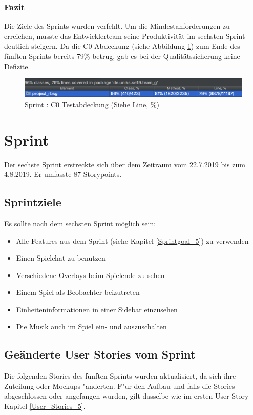 \documentclass[12pt, titlepage]{scrartcl}
\newcommand{\RN}[1]{%
	\textup{\uppercase\expandafter{\romannumeral#1}}%
}
\begin{document}
        	\subsubsection{Fazit}
        		Die Ziele des Sprints wurden verfehlt. Um die Mindestanforderungen zu erreichen, musste das Entwicklerteam seine Produktivit\"at im sechsten Sprint deutlich steigern. Da die C0 Abdeckung (siehe Abbildung \ref{Coverage_5}) zum Ende des f\"unften Sprints bereits 79\% betrug, gab es bei der Qualit\"atssicherung keine Defizite.
        		\begin{figure}[H] 
        			\centering
        			\includegraphics[width=\textwidth]{images/sprintV/coverage.png}
        			\caption{Sprint \RN{5}: C0 Testabdeckung (Siehe Line, \%)}
        			\label{Coverage_5}
        		\end{figure} 
    \newpage
    \section{Sprint \RN{6}}
    	Der sechste Sprint erstreckte sich \"uber dem Zeitraum vom 22.7.2019 bis zum 4.8.2019. Er umfasste 87 Storypoints.
    	\subsection{Sprintziele}
    		Es sollte nach dem sechsten Sprint m\"oglich sein:
    		\begin{itemize}
    			\item Alle Features aus dem Sprint \RN{5} (siehe Kapitel \ref{Sprintgoal_5}) zu verwenden
    			\item Einen Spielchat zu benutzen
    			\item Verschiedene Overlays beim Spielende zu sehen
    			\item Einem Spiel als Beobachter beizutreten
    			\item Einheiteninformationen in einer Sidebar einzusehen
    			\item Die Musik auch im Spiel ein- und auszuschalten
    		\end{itemize}
    	\subsection{Ge\"anderte User Stories vom Sprint \RN{5}}
    		Die folgenden Stories des f\"unften Sprints wurden aktualisiert, da sich ihre Zuteilung oder Mockups "anderten. F"ur den Aufbau und falls die Stories abgeschlossen oder angefangen wurden, gilt dasselbe wie im ersten User Story Kapitel \ref{User_Stories_5}.
\end{document}
